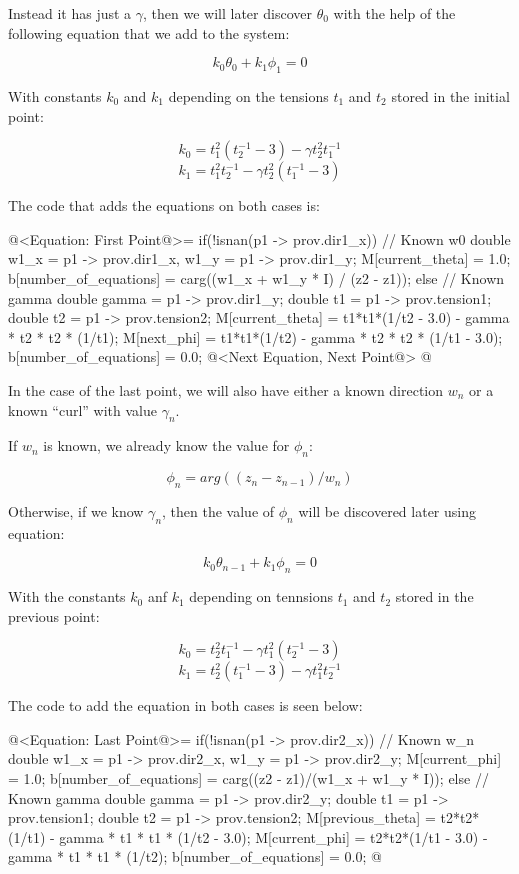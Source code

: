 Instead it has just a $\gamma$, then we will later discover $\theta_0$
with the help of the following equation that we add to the system:

$$
k_0\theta_0+k_1\phi_1=0
$$

With constants $k_0$ and $k_1$ depending on the tensions $t_1$ and
$t_2$ stored in the initial point:

$$
k_0=t_1^2(t_2^{-1}-3)-\gamma t_2^2t_1^{-1}
$$
$$
k_1=t_1^2t_2^{-1}-\gamma t_2^2(t_1^{-1}-3)
$$

The code that adds the equations on both cases is:

\iniciocodigo
@<Equation: First Point@>=
if(!isnan(p1 -> prov.dir1_x)){ // Known w0
  double w1_x = p1 -> prov.dir1_x, w1_y = p1 -> prov.dir1_y;
  M[current_theta] = 1.0;
  b[number_of_equations] = carg((w1_x + w1_y * I) / (z2 - z1));
}
else{ // Known gamma
  double gamma = p1 -> prov.dir1_y;
  double t1 = p1 -> prov.tension1;
  double t2 = p1 -> prov.tension2;
  M[current_theta] = t1*t1*(1/t2 - 3.0) - gamma * t2 * t2 * (1/t1);
  M[next_phi] = t1*t1*(1/t2) - gamma * t2 * t2 * (1/t1 - 3.0);
  b[number_of_equations] = 0.0;
}
@<Next Equation, Next Point@>
@
\fimcodigo

In the case of the last point, we will also have either a known
direction $w_n$ or a known ``curl'' with value $\gamma_n$.

If $w_n$ is known, we already know the value for $\phi_n$:

$$
\phi_n = arg((z_n - z_{n-1})/w_n)
$$

Otherwise, if we know $\gamma_n$, then the value of $\phi_n$ will be
discovered later using equation:

$$
k_0\theta_{n-1}+k_1\phi_{n}=0
$$

With the constants $k_0$ anf $k_1$ depending on tennsions $t_1$ and
$t_2$ stored in the previous point:

$$
k_0=t_2^2t_1^{-1}-\gamma t_1^2(t_2^{-1}-3)
$$
$$
k_1=t_2^2(t_1^{-1}-3)-\gamma t_1^2t_2^{-1}
$$

The code to add the equation in both cases is seen below:

\iniciocodigo
@<Equation: Last Point@>=
if(!isnan(p1 -> prov.dir2_x)){ // Known w_n 
  double w1_x = p1 -> prov.dir2_x, w1_y = p1 -> prov.dir2_y;
  M[current_phi] = 1.0;
  b[number_of_equations] = carg((z2 - z1)/(w1_x + w1_y * I));
}
else{ // Known gamma
  double gamma = p1 -> prov.dir2_y;
  double t1 = p1 -> prov.tension1;
  double t2 = p1 -> prov.tension2;
  M[previous_theta] = t2*t2*(1/t1) - gamma * t1 * t1 * (1/t2 - 3.0);
  M[current_phi] = t2*t2*(1/t1 - 3.0) - gamma * t1 * t1 * (1/t2);
  b[number_of_equations] = 0.0;
}
@
\fimcodigo


